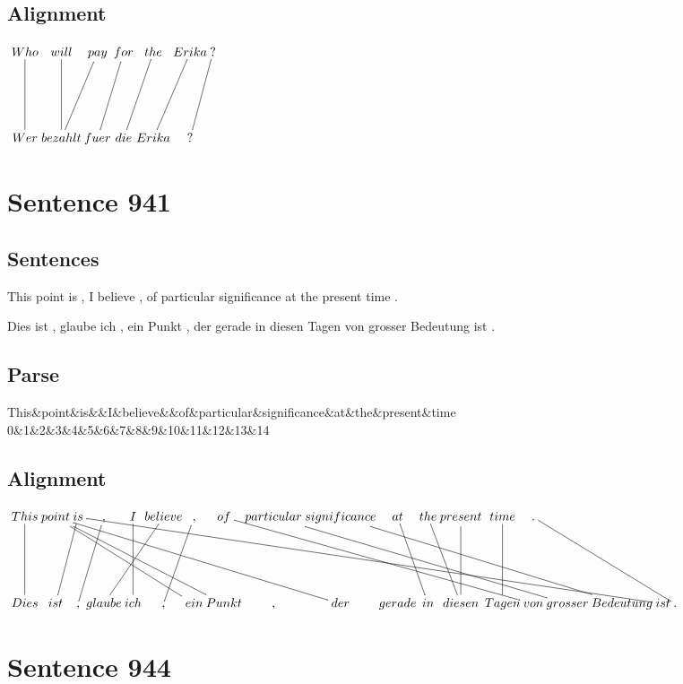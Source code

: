 \documentclass{report}
\begin{document}
\subsection*{Alignment}
\scriptsize{
$
\xymatrix@C-2.3pc{
Who \ar @{-} [dd] & will \ar @{-} [dd] & pay \ar @{-} [ddl] & for \ar @{-} [ddl] & the \ar @{-} [ddl] & Erika \ar @{-} [ddl] & ? \ar @{-} [ddl]\\\\
Wer & bezahlt & fuer & die & Erika & ?
}$}
\newpage\section*{Sentence 941}

\subsection*{Sentences}
This point is , I believe , of particular significance at the present time .

\noindent Dies ist , glaube ich , ein Punkt , der gerade in diesen Tagen von grosser Bedeutung ist .



\subsection*{Parse}
\begin{dependency}[theme=simple]
\begin{deptext}[column sep=.5cm, row sep=.1ex]
This\&point\&is\&\&I\&believe\&\&of\&particular\&significance\&at\&the\&present\&time\\
0\&1\&2\&3\&4\&5\&6\&7\&8\&9\&10\&11\&12\&13\&14\\
\end{deptext}
\end{dependency}


\subsection*{Alignment}
\scriptsize{
$
\xymatrix@C-2.3pc{
This \ar @{-} [dd] & point \ar @{-} [ddrrrrr] \ar @{-} [ddrrrrrrrr] \ar @{-} [ddrrrrrr] & is \ar @{-} [ddl] \ar @{-} [ddrrrrrrrrrrrrrrr] & , \ar @{-} [ddl] & I \ar @{-} [dd] & believe \ar @{-} [ddll] & , \ar @{-} [ddl] & of \ar @{-} [ddrrrrrrr] & particular \ar @{-} [ddrrrrrrr] & significance \ar @{-} [ddrrrrrrr] & at \ar @{-} [ddr] & the \ar @{-} [ddr] & present \ar @{-} [dd] & time \ar @{-} [dd] & . \ar @{-} [ddrrrr]\\\\
Dies & ist & , & glaube & ich & , & ein & Punkt & , & der & gerade & in & diesen & Tagen & von & grosser & Bedeutung & ist & .
}$}
\newpage\section*{Sentence 944}
\end{document}
